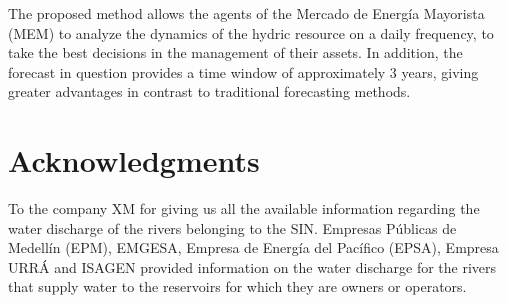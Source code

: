\documentclass[12pt,halfline,a4paper]{ouparticle}
\begin{document}
The proposed method allows the agents of the Mercado de Energía Mayorista (MEM) to analyze the dynamics of the hydric resource on a daily frequency, to take the best decisions in the management of their assets. In addition, the forecast in question provides a time window of approximately 3 years, giving greater advantages in contrast to traditional forecasting methods.

\section*{Acknowledgments}

To the company XM for giving us all the available information regarding the water discharge of the rivers belonging to the SIN. Empresas Públicas de Medellín (EPM), EMGESA, Empresa de Energía del Pacífico (EPSA), Empresa URRÁ and ISAGEN provided information on the water discharge for the rivers that supply water to the reservoirs for which they are owners or operators.



\end{document}
